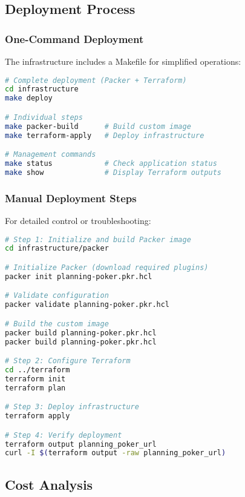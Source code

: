 \documentclass[11pt,a4paper]{article}
\begin{document}
\subsection{Deployment Process}

\subsubsection{One-Command Deployment}

The infrastructure includes a Makefile for simplified operations:

\begin{lstlisting}[language=bash, caption=Automated Deployment]
# Complete deployment (Packer + Terraform)
cd infrastructure
make deploy

# Individual steps
make packer-build      # Build custom image
make terraform-apply   # Deploy infrastructure

# Management commands
make status            # Check application status
make show              # Display Terraform outputs
\end{lstlisting}

\subsubsection{Manual Deployment Steps}

For detailed control or troubleshooting:

\begin{lstlisting}[language=bash, caption=Manual Deployment Process]
# Step 1: Initialize and build Packer image
cd infrastructure/packer

# Initialize Packer (download required plugins)
packer init planning-poker.pkr.hcl

# Validate configuration
packer validate planning-poker.pkr.hcl

# Build the custom image
packer build planning-poker.pkr.hcl
packer build planning-poker.pkr.hcl

# Step 2: Configure Terraform
cd ../terraform
terraform init
terraform plan

# Step 3: Deploy infrastructure
terraform apply

# Step 4: Verify deployment
terraform output planning_poker_url
curl -I $(terraform output -raw planning_poker_url)
\end{lstlisting}

\subsection{Cost Analysis}
\end{document}
